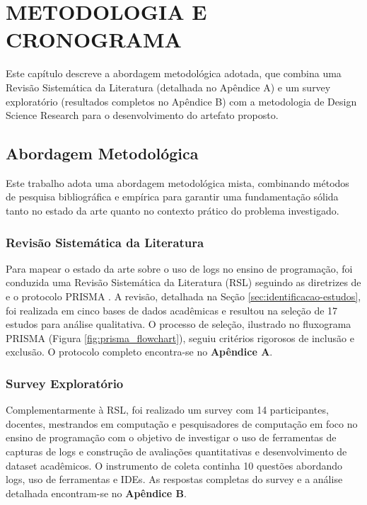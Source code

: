 \chapter{METODOLOGIA E CRONOGRAMA}
\label{cap:metodologia}

Este capítulo descreve a abordagem metodológica adotada, que combina uma Revisão Sistemática da Literatura (detalhada no Apêndice A) e um survey exploratório (resultados completos no Apêndice B) com a metodologia de Design Science Research para o desenvolvimento do artefato proposto. 

\section{Abordagem Metodológica}
\label{sec:abordagem-metodologica}
Este trabalho adota uma abordagem metodológica mista, combinando métodos de pesquisa bibliográfica e empírica para garantir uma fundamentação sólida tanto no estado da arte quanto no contexto prático do problema investigado.

\subsection{Revisão Sistemática da Literatura}
\label{subsec:revisao-sistematica}

Para mapear o estado da arte sobre o uso de logs no ensino de programação, foi conduzida uma Revisão Sistemática da Literatura (RSL) seguindo as diretrizes de \cite{kitchenham2004procedures} e o protocolo PRISMA \cite{page2021prisma}. A revisão, detalhada na Seção \ref{sec:identificacao-estudos}, foi realizada em cinco bases de dados acadêmicas e resultou na seleção de 17 estudos para análise qualitativa. O processo de seleção, ilustrado no fluxograma PRISMA (Figura \ref{fig:prisma_flowchart}), seguiu critérios rigorosos de inclusão e exclusão. O protocolo completo encontra-se no \textbf{Apêndice A}.

\subsection{Survey Exploratório}
\label{subsec:survey}

Complementarmente à RSL, foi realizado um survey com 14 participantes, docentes, mestrandos em computação e pesquisadores de computação em foco no ensino de programação com o objetivo de investigar o uso de ferramentas de capturas de logs e construção de avaliações quantitativas e desenvolvimento de dataset acadêmicos. O instrumento de coleta continha 10 questões abordando logs, uso de ferramentas e IDEs. As respostas completas do survey e a análise detalhada encontram-se no \textbf{Apêndice B}.

